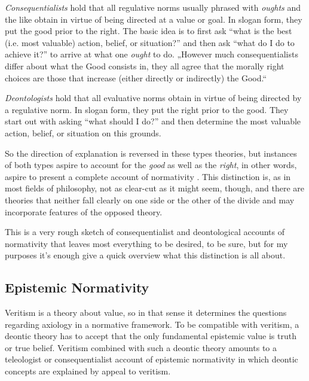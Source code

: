 \documentclass[12pt,numbers=noenddot]{scrartcl}
\begin{document}
\emph{Consequentialists} hold that all regulative norms usually phrased with \emph{oughts} and the like obtain in virtue of being directed at a value or goal. In slogan form, they put the good prior to the right. The basic idea is to first ask “what is the best (i.e. most valuable) action, belief, or situation?” and then ask “what do I do to achieve it?” to arrive at what one \emph{ought} to do. „However much consequentialists differ about what the Good consists in, they all agree that the morally right choices are those that increase (either directly or indirectly) the Good.“ \autocite{sep-ethics-deontological}

\emph{Deontologists} hold that all evaluative norms obtain in virtue of being directed by a regulative norm. In slogan form, they put the right prior to the good. They start out with asking “what should I do?” and then determine the most valuable action, belief, or situation on this grounds.

So the direction of explanation is reversed in these types theories, but instances of both types aspire to account for the \emph{good} as well as the \emph{right}, in other words, aspire to present a complete account of normativity \parencite[341]{Berker2013-BERETA-2}. This distinction is, as in most fields of philosophy, not as clear-cut as it might seem, though, and there are theories that neither fall clearly on one side or the other of the divide and may incorporate features of the opposed theory.

This is a very rough sketch of consequentialist and deontological accounts of normativity that leaves most everything to be desired, to be sure, but for my purposes it's enough give a quick overview what this distinction is all about.

\subsection{Epistemic Normativity} \label{subsec: epistemic}

Veritism is a theory about value, so in that sense it determines the questions regarding axiology in a normative framework. To be compatible with veritism, a deontic theory has to accept that the only fundamental epistemic value is truth or true belief. Veritism combined with such a deontic theory amounts to a teleologist or consequentialist account of epistemic normativity in which deontic concepts are explained by appeal to veritism.
\end{document}
